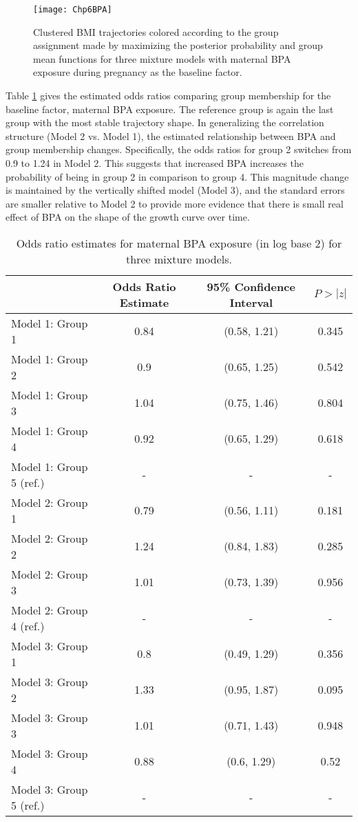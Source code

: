 \begin{figure}[h]
\begin{center}
\texttt{[image: Chp6BPA]}
\end{center}
\label{fig:6-2}
\caption{Clustered BMI trajectories colored according to the group assignment made by maximizing the posterior probability and group mean functions for three mixture models with maternal BPA exposure during pregnancy as the baseline factor.}
\end{figure}

Table \ref{tab:6-2} gives the estimated odds ratios comparing group membership for the baseline factor, maternal BPA exposure. The reference group is again the last group with the most stable trajectory shape. In generalizing the correlation structure (Model 2 vs. Model 1), the estimated relationship between BPA and group membership changes. Specifically, the odds ratios for group 2 switches from 0.9 to 1.24 in Model 2. This suggests that increased BPA increases the probability of being in group 2 in comparison to group 4. This magnitude change is maintained by the vertically shifted model (Model 3), and the standard errors are smaller relative to Model 2 to provide more evidence that there is small real effect of BPA on the shape of the growth curve over time. 

\begin{table}[ht]
\begin{center}
\begin{tabular}{lccc}
  \hline
 & Odds Ratio Estimate & 95\% Confidence Interval & $P>|z|$ \\ 
  \hline
Model 1: Group  1 & 0.84 & (0.58, 1.21) & 0.345 \\ 
  Model 1: Group  2 & 0.9 & (0.65, 1.25) & 0.542 \\ 
  Model 1: Group  3 & 1.04 & (0.75, 1.46) & 0.804 \\ 
  Model 1: Group  4 & 0.92 & (0.65, 1.29) & 0.618 \\ 
  Model 1: Group  5  (ref.) & - & - & - \\ 
  Model 2: Group  1 & 0.79 & (0.56, 1.11) & 0.181 \\ 
  Model 2: Group  2 & 1.24 & (0.84, 1.83) & 0.285 \\ 
  Model 2: Group  3 & 1.01 & (0.73, 1.39) & 0.956 \\ 
  Model 2: Group  4  (ref.) & - & - & - \\ 
  Model 3: Group  1 & 0.8 & (0.49, 1.29) & 0.356 \\ 
  Model 3: Group  2 & 1.33 & (0.95, 1.87) & 0.095 \\ 
  Model 3: Group  3 & 1.01 & (0.71, 1.43) & 0.948 \\ 
  Model 3: Group  4 & 0.88 & (0.6, 1.29) & 0.52 \\ 
  Model 3: Group  5  (ref.) & - & - & - \\ 
   \hline
\end{tabular}
\caption{Odds ratio estimates for maternal BPA exposure (in log base 2) for three mixture models. }
\end{center}
\label{tab:6-2}
\end{table}

